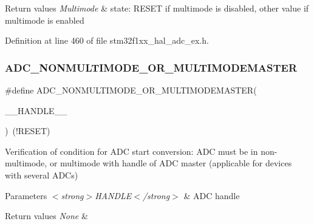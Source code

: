 \begin{DoxyRetVals}{Return values}
{\em Multimode} & state\+: R\+E\+S\+ET if multimode is disabled, other value if multimode is enabled \\
\hline
\end{DoxyRetVals}


Definition at line 460 of file stm32f1xx\+\_\+hal\+\_\+adc\+\_\+ex.\+h.

\mbox{\label{group___a_d_c_ex___private___macro_ga0b97545981bf2d7f767a98fd018c78af}} 
\subsubsection{\texorpdfstring{A\+D\+C\+\_\+\+N\+O\+N\+M\+U\+L\+T\+I\+M\+O\+D\+E\+\_\+\+O\+R\+\_\+\+M\+U\+L\+T\+I\+M\+O\+D\+E\+M\+A\+S\+T\+ER}{ADC\_NONMULTIMODE\_OR\_MULTIMODEMASTER}}
{\footnotesize\ttfamily \#define A\+D\+C\+\_\+\+N\+O\+N\+M\+U\+L\+T\+I\+M\+O\+D\+E\+\_\+\+O\+R\+\_\+\+M\+U\+L\+T\+I\+M\+O\+D\+E\+M\+A\+S\+T\+ER(\begin{DoxyParamCaption}\item[{}]{\+\_\+\+\_\+\+H\+A\+N\+D\+L\+E\+\_\+\+\_\+ }\end{DoxyParamCaption})~(!R\+E\+S\+ET)}



Verification of condition for A\+DC start conversion\+: A\+DC must be in non-\/multimode, or multimode with handle of A\+DC master (applicable for devices with several A\+D\+Cs) 


\begin{DoxyParams}{Parameters}
{\em $<$strong$>$\+H\+A\+N\+D\+L\+E$<$/strong$>$} & A\+DC handle \\
\hline
\end{DoxyParams}

\begin{DoxyRetVals}{Return values}
{\em None} & \\
\hline
\end{DoxyRetVals}


